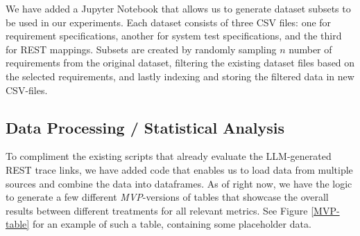 \documentclass[conference]{IEEEtran}
\begin{document}
We have added a Jupyter Notebook that allows us to generate dataset subsets to be used in our experiments. Each dataset consists of three CSV files: one for requirement specifications, another for system test specifications, and the third for REST mappings. Subsets are created by randomly sampling $n$ number of requirements from the original dataset, filtering the existing dataset files based on the selected requirements, and lastly indexing and storing the filtered data in new CSV-files. 



\subsection{Data Processing / Statistical Analysis}

To compliment the existing scripts that already evaluate the LLM-generated REST trace links, we have added code that enables us to load data from multiple sources and combine the data into dataframes. As of right now, we have the logic to generate a few different \textit{MVP}-versions of tables that showcase the overall results between different treatments for all relevant metrics. See Figure \ref{MVP-table} for an example of such a table, containing some placeholder data.
\end{document}
